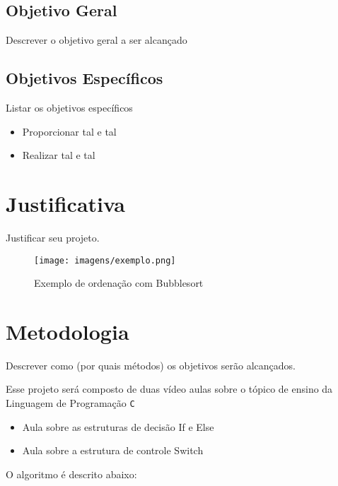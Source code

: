 \documentclass[a4paper,10pt]{article}  %
\begin{document}
\subsection{Objetivo Geral}

Descrever o objetivo geral a ser alcançado

\subsection{Objetivos Específicos}

Listar os objetivos específicos

\begin{itemize}
 \item Proporcionar tal e tal
 \item Realizar tal e tal
\end{itemize}


\section{Justificativa}

Justificar seu projeto.

\begin{figure}[ht]
\centering
\texttt{[image: imagens/exemplo.png]}
\caption{Exemplo de ordenação com Bubblesort}
\label{fig:xsort}
\end{figure}


\section{Metodologia}

Descrever como (por quais métodos) os objetivos serão alcançados.

 Esse projeto será composto de duas vídeo aulas sobre o tópico de ensino da Linguagem de Programação \texttt{C}

\begin{itemize}

 \item Aula sobre as estruturas de decisão If e Else
 \item Aula sobre a estrutura de controle Switch
\end{itemize}


O algoritmo é descrito abaixo:


\end{document}
